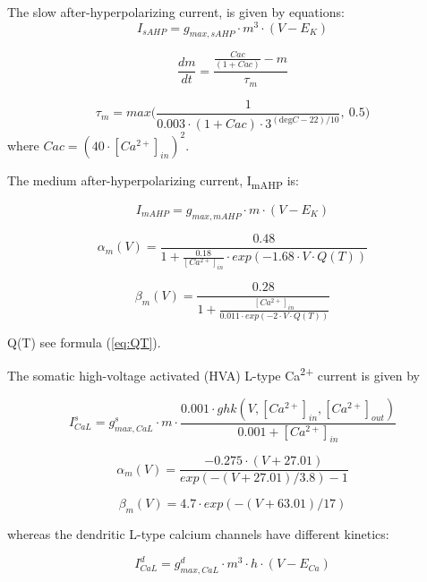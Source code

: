 \documentclass[a4paper,12pt]{article}
\begin{document}
The slow after-hyperpolarizing current, is given by equations:
\begin{equation}
I_{sAHP}= g_{max, sAHP} \cdot m^3 \cdot (V-E_K)
\end{equation}

\begin{equation}
\frac{dm}{dt}=\frac{\frac{Cac}{(1+Cac)}-m}{\tau_m}
\end{equation}

\begin{equation}
\tau_m=max \Big(\frac {1}{0.003 \cdot (1+Cac)\cdot 3^{(\text{deg}C-22)/10}}, \ 0.5 \Big)
\end{equation}
where 
$Cac=(40 \cdot [Ca^{2+}]_{in})^2$.

The medium after-hyperpolarizing current, I\textsubscript{mAHP} is:

\begin{equation}
I_{mAHP}= g_{max, mAHP}\cdot m\cdot (V-E_K)
\end{equation}

\begin{equation}
\alpha_m(V)=\frac{0.48}{1+\frac{0.18}{[Ca^{2+}]_{in}}\cdot exp(-1.68\cdot V\cdot Q(T))}
\end{equation}

\begin{equation}
\beta_m(V)=\frac{0.28}{1+\frac{[Ca^{2+}]_{in}}{0.011\cdot exp(-2\cdot V\cdot Q(T))}}
\end{equation}

Q(T) see formula (\ref{eq:QT}). \par
The somatic high-voltage activated (HVA) L-type Ca\textsuperscript{2+} current is given by


\begin{equation}
I_{CaL}^s= g_{max, CaL}^s\cdot m\cdot \frac{0.001 \cdot ghk(V, [Ca^{2+}]_{in}, [Ca^{2+}]_{out}) }{0.001 + [Ca^{2+}]_{in}}
\end{equation}

\begin{equation}
\alpha_m(V)= \frac{-0.275 \cdot (V+27.01)}{exp(-(V+27.01)/3.8)-1}
\end{equation}

\begin{equation}
 \beta_m(V)= 4.7 \cdot exp(-(V+63.01)/17)
\end{equation}


whereas the dendritic L-type calcium channels have different kinetics: 


\begin{equation}
I_{CaL}^d= g_{max, CaL}^d \cdot m^3 \cdot h \cdot
(V-E_{Ca})
\end{equation}
\end{document}
